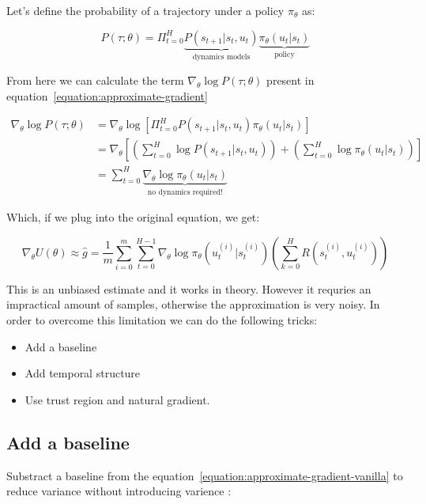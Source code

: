 \documentclass{../main.tex}{subfiles}
\begin{document}
Let's define the probability of a trajectory under a policy $\pi_{\theta}$ as: 

\begin{equation}
P (\tau; \theta) = \Pi_{t=0}^{H} \underbrace{P (s_{t+1} | s_t, u_t)}_\textrm{dynamics models} \underbrace{\pi_{\theta} (u_t | s_t)}_\textrm{policy}
\end{equation}

From here we can calculate the term $\nabla_{\theta} \log P(\tau ; \theta)$ present in equation~\ref{equation:approximate-gradient}

\begin{equation}
\begin{split}
\nabla_{\theta} \log P(\tau ; \theta) & = \nabla_{\theta} \log [\Pi_{t=0}^{H} P(s_{t+1} | s_t, u_t) \pi_{\theta}(u_t | s_t)] \\
 & = \nabla_{\theta} [(\sum_{t=0}^{H} \log P(s_{t+1} | s_t, u_t)) + (\sum_{t=0}^{H} \log \pi_{\theta}(u_t | s_t))] \\ 
 & = \sum_{t=0}^{H} \underbrace{\nabla_{\theta} \log \pi_{\theta}(u_t | s_t)}_\textrm{no dynamics required!}
\end{split}
\end{equation}

Which, if we plug into the original equation, we get:

\begin{equation}
\nabla_{\theta}U(\theta) \approx \hat{g} = \frac{1}{m} \sum_{i = 0}^{m} \sum_{t=0}^{H-1} \nabla_{\theta} \log \pi_{\theta}(u_t^{(i)} | s_t^{(i)}) (\sum_{k=0}^{H}R(s_t^{(i)}, u_t^{(i)}))
\end{equation}

This is an unbiased estimate and it works in theory. However it requries an impractical amount of samples, otherwise the approximation is very noisy. In order to overcome this limitation we can do the following tricks:
\begin{itemize}
\item Add a baseline
\item Add temporal structure
\item Use trust region and natural gradient.
\end{itemize}

\subsection{Add a baseline}
Substract a baseline from the equation~\ref{equation:approximate-gradient-vanilla} to reduce variance without introducing varience \citep{ Williams1992}:
\end{document}
